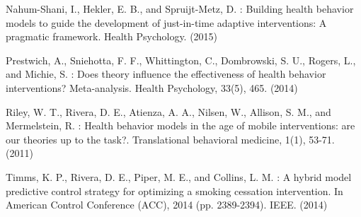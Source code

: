 \documentclass[runningheads,a4paper]{llncs}
\begin{document}
\begin{thebibliography}{4}
 Nahum-Shani, I., Hekler, E. B., and Spruijt-Metz, D. : Building health behavior models to guide the development of just-in-time adaptive interventions: A pragmatic framework. Health Psychology. (2015)

 Prestwich, A., Sniehotta, F. F., Whittington, C., Dombrowski, S. U., Rogers, L., and Michie, S. : Does theory influence the effectiveness of health behavior interventions? Meta-analysis. Health Psychology, 33(5), 465. (2014)

 Riley, W. T., Rivera, D. E., Atienza, A. A., Nilsen, W., Allison, S. M., and Mermelstein, R. : Health behavior models in the age of mobile interventions: are our theories up to the task?. Translational behavioral medicine, 1(1), 53-71. (2011)

 Timms, K. P., Rivera, D. E., Piper, M. E., and Collins, L. M. : A hybrid model predictive control strategy for optimizing a smoking cessation intervention. In American Control Conference (ACC), 2014 (pp. 2389-2394). IEEE. (2014)







\end{thebibliography}
\end{document}
